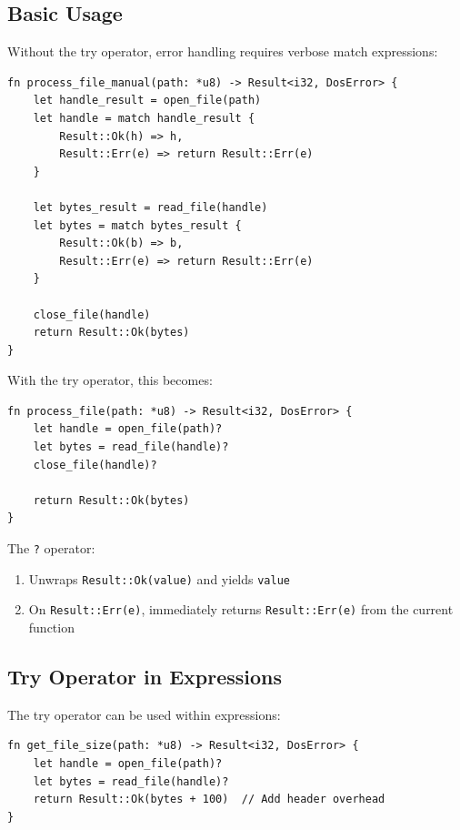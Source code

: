 \subsection{Basic Usage}
\label{subsec:try-basic}

Without the try operator, error handling requires verbose match expressions:

\begin{lstlisting}
fn process_file_manual(path: *u8) -> Result<i32, DosError> {
    let handle_result = open_file(path)
    let handle = match handle_result {
        Result::Ok(h) => h,
        Result::Err(e) => return Result::Err(e)
    }

    let bytes_result = read_file(handle)
    let bytes = match bytes_result {
        Result::Ok(b) => b,
        Result::Err(e) => return Result::Err(e)
    }

    close_file(handle)
    return Result::Ok(bytes)
}
\end{lstlisting}

With the try operator, this becomes:

\begin{lstlisting}
fn process_file(path: *u8) -> Result<i32, DosError> {
    let handle = open_file(path)?
    let bytes = read_file(handle)?
    close_file(handle)?

    return Result::Ok(bytes)
}
\end{lstlisting}

The \texttt{?} operator:
\begin{enumerate}
    \item Unwraps \texttt{Result::Ok(value)} and yields \texttt{value}
    \item On \texttt{Result::Err(e)}, immediately returns \texttt{Result::Err(e)} from the current function
\end{enumerate}

\subsection{Try Operator in Expressions}
\label{subsec:try-expressions}

The try operator can be used within expressions:

\begin{lstlisting}
fn get_file_size(path: *u8) -> Result<i32, DosError> {
    let handle = open_file(path)?
    let bytes = read_file(handle)?
    return Result::Ok(bytes + 100)  // Add header overhead
}
\end{lstlisting}

